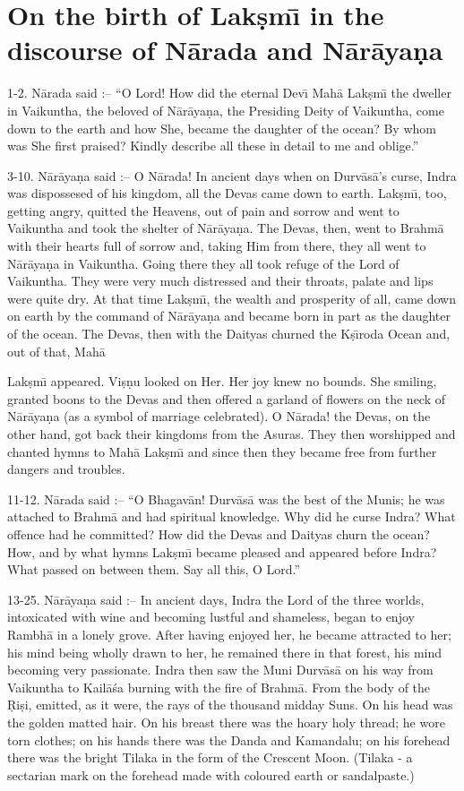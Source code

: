 \chapter{On the birth of Lak\d{s}m\={\i} in the discourse of N\=arada and N\=ar\=aya\d{n}a}

1-2. N\=arada said :-- ``O Lord! How did the eternal Dev\={\i} Mah\=a Lak\d{s}m\={\i} the dweller in Vaikuntha, the beloved of N\=ar\=aya\d{n}a, the Presiding Deity of Vaikuntha, come down to the earth and how She, became the daughter of the ocean? By whom was She first praised? Kindly describe all these in detail to me and oblige.''

3-10. N\=ar\=aya\d{n}a said :-- O N\=arada! In ancient days when on Durv\=as\=a's curse, Indra was dispossesed of his kingdom, all the Devas came down to earth. Lak\d{s}m\={\i}, too, getting angry, quitted the Heavens, out of pain and sorrow and went to Vaikuntha and took the shelter of N\=ar\=aya\d{n}a. The Devas, then, went to Brahm\=a with their hearts full of sorrow and, taking Him from there, they all went to N\=ar\=aya\d{n}a in Vaikuntha. Going there they all took refuge of the Lord of Vaikuntha. They were very much distressed and their throats, palate and lips were quite dry. At that time Lak\d{s}m\={\i}, the wealth and prosperity of all, came down on earth by the command of N\=ar\=aya\d{n}a and became born in part as the daughter of the ocean. The Devas, then with the Daityas churned the K\d{s}\={\i}roda Ocean and, out of that, Mah\=a

Lak\d{s}m\={\i} appeared. Vi\d{s}\d{n}u looked on Her. Her joy knew no bounds. She smiling, granted boons to the Devas and then offered a garland of flowers on the neck of N\=ar\=aya\d{n}a (as a symbol of marriage celebrated). O N\=arada! the Devas, on the other hand, got back their kingdoms from the Asuras. They then worshipped and chanted hymns to Mah\=a Lak\d{s}m\={\i} and since then they became free from further dangers and troubles.

11-12. N\=arada said :-- ``O Bhagav\=an! Durv\=as\=a was the best of the Munis; he was attached to Brahm\=a and had spiritual knowledge. Why did he curse Indra? What offence had he committed? How did the Devas and Daityas churn the ocean? How, and by what hymns Lak\d{s}m\={\i} became pleased and appeared before Indra? What passed on between them. Say all this, O Lord.''

13-25. N\=ar\=aya\d{n}a said :-- In ancient days, Indra the Lord of the three worlds, intoxicated with wine and becoming lustful and shameless, began to enjoy Rambh\=a in a lonely grove. After having enjoyed her, he became attracted to her; his mind being wholly drawn to her, he remained there in that forest, his mind becoming very passionate. Indra then saw the Muni Durv\=as\=a on his way from Vaikuntha to Kail\=a\'sa burning with the fire of Brahm\=a. From the body of the \d{R}i\d{s}i, emitted, as it were, the rays of the thousand midday Suns. On his head was the golden matted hair. On his breast there was the hoary holy thread; he wore torn clothes; on his hands there was the Danda and Kamandalu; on his forehead there was the bright Tilaka in the form of the Crescent Moon. (Tilaka - a sectarian mark on the forehead made with coloured earth or sandalpaste.)

